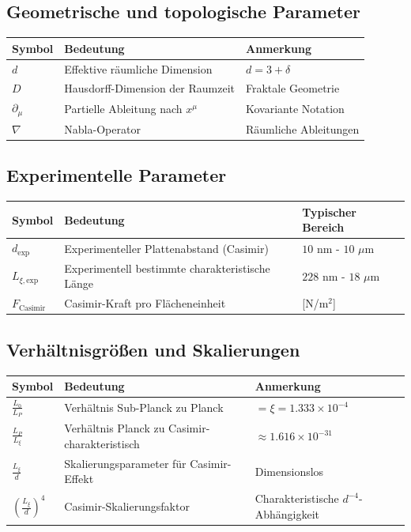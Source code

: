 	\subsection{Geometrische und topologische Parameter}
	\begin{longtable}{p{2cm} p{8cm} p{3cm}}
		\toprule
		\textbf{Symbol} & \textbf{Bedeutung} & \textbf{Anmerkung} \\
		\midrule
		$d$ & Effektive räumliche Dimension & $d = 3 + \delta$ \\
		$D$ & Hausdorff-Dimension der Raumzeit & Fraktale Geometrie \\
		$\partial_\mu$ & Partielle Ableitung nach $x^\mu$ & Kovariante Notation \\
		$\nabla$ & Nabla-Operator & Räumliche Ableitungen \\
		\bottomrule
	\end{longtable}
	
	\subsection{Experimentelle Parameter}
	\begin{longtable}{p{2cm} p{8cm} p{3cm}}
		\toprule
		\textbf{Symbol} & \textbf{Bedeutung} & \textbf{Typischer Bereich} \\
		\midrule
		$d_{\text{exp}}$ & Experimenteller Plattenabstand (Casimir) & $10$ nm - $10$ $\mu$m \\
		$L_{\xi,\text{exp}}$ & Experimentell bestimmte charakteristische Länge & $228$ nm - $18$ $\mu$m \\
		$F_{\text{Casimir}}$ & Casimir-Kraft pro Flächeneinheit & [N/m$^2$] \\
		\bottomrule
	\end{longtable}
	
	\subsection{Verhältnisgrößen und Skalierungen}
	\begin{longtable}{p{2cm} p{8cm} p{3cm}}
		\toprule
		\textbf{Symbol} & \textbf{Bedeutung} & \textbf{Anmerkung} \\
		\midrule
		$\frac{L_0}{L_P}$ & Verhältnis Sub-Planck zu Planck & $= \xi = 1.333 \times 10^{-4}$ \\
		$\frac{L_P}{L_\xi}$ & Verhältnis Planck zu Casimir-charakteristisch & $\approx 1.616 \times 10^{-31}$ \\
		$\frac{L_\xi}{d}$ & Skalierungsparameter für Casimir-Effekt & Dimensionslos \\
		$\left(\frac{L_\xi}{d}\right)^4$ & Casimir-Skalierungsfaktor & Charakteristische $d^{-4}$-Abhängigkeit \\
		\bottomrule
	\end{longtable}
	
